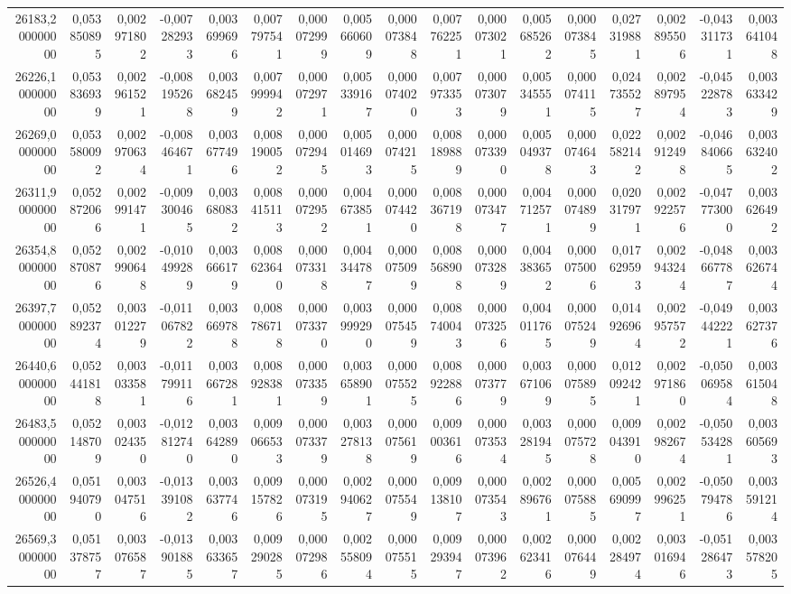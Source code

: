 \begin{longtable}{rrrrrrrrrrrrrrrrr}
26183,200000000 & 0,053850895 & 0,002971802 & -0,007282933 & 0,003699696 & 0,007797541 & 0,000072999 & 0,005660609 & 0,000073848 & 0,007762251 & 0,000073021 & 0,005685262 & 0,000073845 & 0,027319881 & 0,002895506 & -0,043311731 & 0,003641048\\
26226,100000000 & 0,053836939 & 0,002961521 & -0,008195268 & 0,003682459 & 0,007999942 & 0,000072971 & 0,005339167 & 0,000074020 & 0,007973353 & 0,000073079 & 0,005345551 & 0,000074115 & 0,024735527 & 0,002897954 & -0,045228783 & 0,003633429\\
26269,000000000 & 0,053580092 & 0,002970634 & -0,008464671 & 0,003677496 & 0,008190052 & 0,000072945 & 0,005014693 & 0,000074215 & 0,008189889 & 0,000073390 & 0,005049378 & 0,000074643 & 0,022582142 & 0,002912498 & -0,046840665 & 0,003632402\\
26311,900000000 & 0,052872066 & 0,002991471 & -0,009300465 & 0,003680832 & 0,008415113 & 0,000072952 & 0,004673851 & 0,000074420 & 0,008367198 & 0,000073477 & 0,004712571 & 0,000074899 & 0,020317971 & 0,002922576 & -0,047773000 & 0,003626492\\
26354,800000000 & 0,052870876 & 0,002990648 & -0,010499289 & 0,003666179 & 0,008623640 & 0,000073318 & 0,004344787 & 0,000075099 & 0,008568908 & 0,000073289 & 0,004383652 & 0,000075006 & 0,017629593 & 0,002943244 & -0,048667787 & 0,003626744\\
26397,700000000 & 0,052892374 & 0,003012279 & -0,011067822 & 0,003669788 & 0,008786718 & 0,000073370 & 0,003999290 & 0,000075459 & 0,008740043 & 0,000073256 & 0,004011765 & 0,000075249 & 0,014926964 & 0,002957572 & -0,049442221 & 0,003627376\\
26440,600000000 & 0,052441818 & 0,003033581 & -0,011799116 & 0,003667281 & 0,008928381 & 0,000073359 & 0,003658901 & 0,000075525 & 0,008922886 & 0,000073779 & 0,003671069 & 0,000075895 & 0,012092421 & 0,002971860 & -0,050069584 & 0,003615048\\
26483,500000000 & 0,052148709 & 0,003024350 & -0,012812740 & 0,003642890 & 0,009066533 & 0,000073379 & 0,003278138 & 0,000075619 & 0,009003616 & 0,000073534 & 0,003281945 & 0,000075728 & 0,009043910 & 0,002982674 & -0,050534281 & 0,003605693\\
26526,400000000 & 0,051940790 & 0,003047516 & -0,013391082 & 0,003637746 & 0,009157826 & 0,000073195 & 0,002940627 & 0,000075549 & 0,009138107 & 0,000073543 & 0,002896761 & 0,000075885 & 0,005690997 & 0,002996251 & -0,050794786 & 0,003591214\\
26569,300000000 & 0,051378757 & 0,003076587 & -0,013901885 & 0,003633657 & 0,009290285 & 0,000072986 & 0,002558094 & 0,000075515 & 0,009293947 & 0,000073962 & 0,002623416 & 0,000076449 & 0,002284974 & 0,003016946 & -0,051286473 & 0,003578205\\

\end{longtable}
